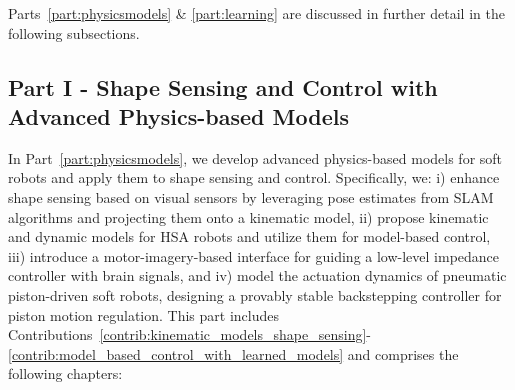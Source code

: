 Parts~\ref{part:physicsmodels} \& \ref{part:learning} are discussed in further detail in the following subsections.

\subsection*{Part I - Shape Sensing and Control with Advanced Physics-based Models}

In Part~\ref{part:physicsmodels}, we develop advanced physics-based models for soft robots and apply them to shape sensing and control. Specifically, we: i) enhance shape sensing based on visual sensors by leveraging pose estimates from \gls{SLAM} algorithms and projecting them onto a kinematic model, ii) propose kinematic and dynamic models for \gls{HSA} robots and utilize them for model-based control, iii) introduce a motor-imagery-based  interface for guiding a low-level impedance controller with brain signals, and iv) model the actuation dynamics of pneumatic piston-driven soft robots, designing a provably stable backstepping controller for piston motion regulation.
%
This part includes Contributions~\ref{contrib:kinematic_models_shape_sensing}-\ref{contrib:model_based_control_with_learned_models} and comprises the following chapters:


